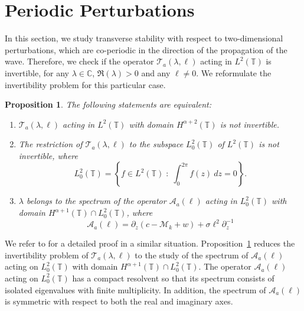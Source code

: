 \documentclass[12pt]{amsart}    %
\newcommand{\T}{\mathbb{T}}
\newcommand{\C}{\mathbb{C}}
\newcommand{\calM}{\mathcal{M}}
\newtheorem{proposition}[theorem]{Proposition}
\numberwithin{equation}{section}
\begin{document}
\section{Periodic Perturbations} \label{sec:perperturb}
In this section, we study transverse stability with respect to two-dimensional perturbations, which are co-periodic in the direction of the propagation of the wave. Therefore, we check if the operator $\mathcal T_a (\lambda,\ell)$ acting in $L^2(\T)$ is invertible, for any $\lambda\in\C$, $\Re(\lambda)>0$ and any $\ell\neq 0$. We reformulate the invertibility problem for this particular case.
\begin{proposition}\label{prop:equiv}
The following statements are equivalent:
\begin{enumerate}
    \item $\mathcal T_a(\lambda,\ell)$ 
acting in $L^2(\T)$ with domain $H^{\alpha+2}(\T)$ is not invertible.
    \item The restriction of $\mathcal T_a(\lambda,\ell)$ to the subspace $L^2_0(\T)$ of $L^2(\T)$ is not invertible, where
    \[
    L^2_0(\T)=\left\{f\in L^2(\T)\;:\;\int_0^{2\pi}f(z)~dz=0\right\}.
    \]
    \item $\lambda$ belongs to the spectrum of the operator $\mathcal A_a(\ell)$ acting in $L^2_0(\T)$ with domain 
$H^{\alpha+1}(\T)\cap L^2_0(\T)$, where
\[
\mathcal A_a(\ell) = \partial_z(c-\calM_k+ w)+\sigma\ell^2\partial_z^{-1}
\]
\end{enumerate}
\end{proposition}

We refer to \cite[Lemma~4.1, Corollary~4.2]{Haragus2011TransverseEquation} for a detailed proof in a similar situation. Proposition~\ref{prop:equiv} reduces the invertibility problem of $\mathcal T_a(\lambda,\ell)$ to the study of the spectrum of $\mathcal A_a(\ell)$ acting on $L^2_0(\T)$ with domain $H^{\alpha+1}(\T)\cap L^2_0(\T)$. The operator $\mathcal A_a(\ell)$ acting on $L^2_0(\T)$ has a compact resolvent so that its spectrum consists of isolated eigenvalues with finite multiplicity. In addition, the spectrum of  $\mathcal A_a(\ell)$ is symmetric with respect to both the real and imaginary axes.
\end{document}
